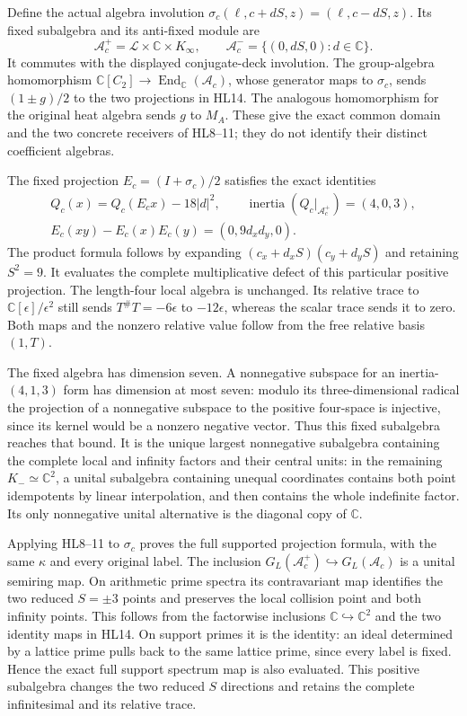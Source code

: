 \documentclass[11pt,a4paper]{article}
\theoremstyle{definition}\newtheorem{definition}[theorem]{Definition}
\begin{document}
Define the actual algebra involution
$\sigma_c(\ell,c+dS,z)=(\ell,c-dS,z)$.
Its fixed subalgebra and its anti-fixed module are
\[
 \mathcal A_c^+=\mathcal L\times\mathbb C\times K_\infty,
 \qquad \mathcal A_c^-=\{(0,dS,0):d\in\mathbb C\}.
 \tag{HL14}
\]
It commutes with the displayed conjugate-deck involution.
The group-algebra homomorphism
$\mathbb C[C_2]\to\operatorname{End}_{\mathbb C}(\mathcal A_c)$,
whose generator maps to $\sigma_c$, sends $(1\pm g)/2$ to
the two projections in HL14. The analogous homomorphism for
the original heat algebra sends $g$ to $M_A$. These give the
exact common domain and the two concrete receivers of HL8--11;
they do not identify their distinct coefficient algebras.

The fixed projection $E_c=(I+\sigma_c)/2$ satisfies the exact
identities
\[
 \begin{gathered}
 Q_c(x)=Q_c(E_cx)-18|d|^2,\qquad
 \operatorname{inertia}(Q_c|_{\mathcal A_c^+})=(4,0,3),\\
 E_c(xy)-E_c(x)E_c(y)
      =(0,9d_xd_y,0).
 \end{gathered}
 \tag{HL15}
\]
The product formula follows by expanding
$(c_x+d_xS)(c_y+d_yS)$ and retaining $S^2=9$.
It evaluates the complete multiplicative defect of this particular
positive projection. The length-four local algebra is unchanged.
Its relative trace to $\mathbb C[\epsilon]/\epsilon^2$ still sends
$T^\#T=-6\epsilon$ to $-12\epsilon$, whereas the scalar trace
sends it to zero. Both maps and the nonzero relative value follow
from the free relative basis $(1,T)$.

The fixed algebra has dimension seven. A nonnegative subspace
for an inertia-$(4,1,3)$ form has dimension at most seven:
modulo its three-dimensional radical the projection of a
nonnegative subspace to the positive four-space is injective,
since its kernel would be a nonzero negative vector.
Thus this fixed subalgebra reaches that bound. It is the unique
largest nonnegative subalgebra containing the complete local and
infinity factors and their central units: in the remaining
$K_-\simeq\mathbb C^2$, a unital subalgebra containing unequal
coordinates contains both point idempotents by linear interpolation,
and then contains the whole indefinite factor. Its only
nonnegative unital alternative is the diagonal copy of $\mathbb C$.

Applying HL8--11 to $\sigma_c$ proves the full supported
projection formula, with the same $\kappa$ and every original
label. The inclusion $G_L(\mathcal A_c^+)\hookrightarrow
G_L(\mathcal A_c)$ is a unital semiring map. On arithmetic
prime spectra its contravariant map identifies the two reduced
$S=\pm3$ points and preserves the local collision point and
both infinity points. This follows from the factorwise
inclusions $\mathbb C\hookrightarrow\mathbb C^2$ and the two
identity maps in HL14. On support primes it is the identity:
an ideal determined by a lattice prime pulls back to the same
lattice prime, since every label is fixed. Hence the exact
full support spectrum map is also evaluated. This positive
subalgebra changes the two reduced $S$ directions and retains
the complete infinitesimal and its relative trace.

\clearpage
\end{document}
